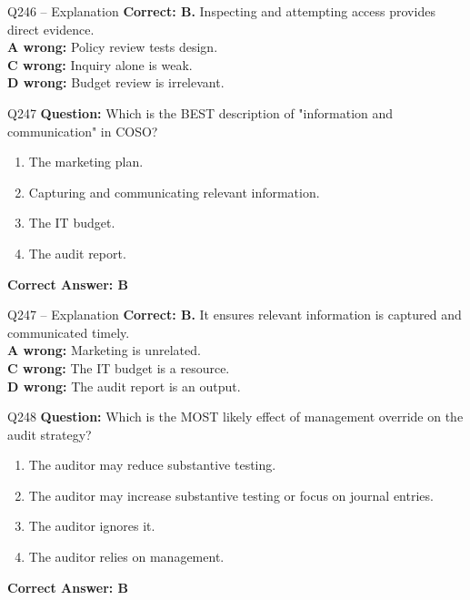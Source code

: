 \documentclass[aspectratio=169,10pt]{beamer}
\begin{document}
	\begin{frame}[t]{Q246 -- Explanation}
		\small
		\textbf{Correct: B.} Inspecting and attempting access provides direct evidence. \\[4pt]
		\textbf{A wrong:} Policy review tests design. \\[2pt]
		\textbf{C wrong:} Inquiry alone is weak. \\[2pt]
		\textbf{D wrong:} Budget review is irrelevant.
	\end{frame}
	
	\begin{frame}[t]{Q247}
		\small
		\textbf{Question:} Which is the BEST description of "information and communication" in COSO?
		\begin{enumerate}[label=\Alph*.,itemsep=1pt,topsep=2pt]
			\item The marketing plan.
			\item Capturing and communicating relevant information.
			\item The IT budget.
			\item The audit report.
		\end{enumerate}
		\vspace{4pt}
		\textbf{Correct Answer: B}
	\end{frame}
	
	\begin{frame}[t]{Q247 -- Explanation}
		\small
		\textbf{Correct: B.} It ensures relevant information is captured and communicated timely. \\[4pt]
		\textbf{A wrong:} Marketing is unrelated. \\[2pt]
		\textbf{C wrong:} The IT budget is a resource. \\[2pt]
		\textbf{D wrong:} The audit report is an output.
	\end{frame}
	
	\begin{frame}[t]{Q248}
		\small
		\textbf{Question:} Which is the MOST likely effect of management override on the audit strategy?
		\begin{enumerate}[label=\Alph*.,itemsep=1pt,topsep=2pt]
			\item The auditor may reduce substantive testing.
			\item The auditor may increase substantive testing or focus on journal entries.
			\item The auditor ignores it.
			\item The auditor relies on management.
		\end{enumerate}
		\vspace{4pt}
		\textbf{Correct Answer: B}
	\end{frame}
	
\end{document}

